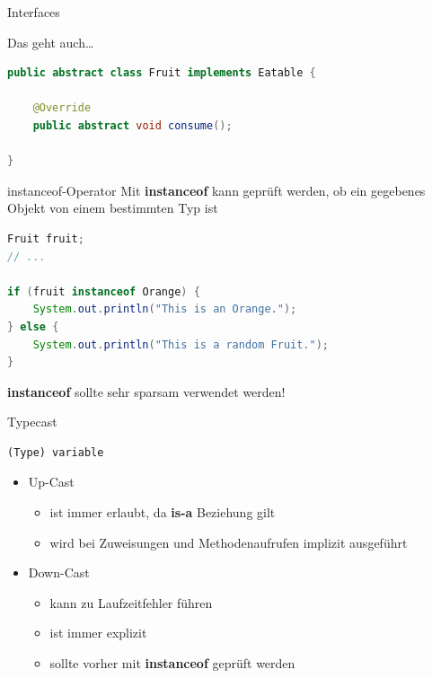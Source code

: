 \documentclass[18pt]{beamer}
\begin{document}
\begin{frame}[fragile]{Interfaces}

    Das geht auch\dots

    \begin{exampleblock}{}
        \begin{lstlisting}[language=Java]
public abstract class Fruit implements Eatable {

    @Override
    public abstract void consume();

}
        \end{lstlisting}

    \end{exampleblock}
\end{frame}


\begin{frame}[fragile]{instanceof-Operator}
    Mit \textbf{instanceof} kann geprüft werden, ob ein gegebenes Objekt von einem bestimmten Typ ist
    \begin{exampleblock}{}
        \begin{lstlisting}[language=Java,basicstyle=\scriptsize]
Fruit fruit;
// ...

if (fruit instanceof Orange) {
    System.out.println("This is an Orange.");
} else {
    System.out.println("This is a random Fruit.");
}
        \end{lstlisting}

    \end{exampleblock}

    \pause

    \alert{\textbf{instanceof} sollte sehr sparsam verwendet werden!}

\end{frame}

\begin{frame}[fragile]{Typecast}
    \begin{lstlisting}
(Type) variable
    \end{lstlisting}

    \vspace{.2in}
    \begin{itemize}
        \item Up-Cast
            \begin{itemize}
                \item ist immer erlaubt, da \textbf{is-a} Beziehung gilt
                \item wird bei Zuweisungen und Methodenaufrufen implizit ausgeführt
            \end{itemize}
        \item Down-Cast
        \begin{itemize}
            \item kann zu Laufzeitfehler führen
            \item ist immer explizit
            \item sollte vorher mit \textbf{instanceof} geprüft werden
        \end{itemize}
    \end{itemize}
\end{frame}
\end{document}
